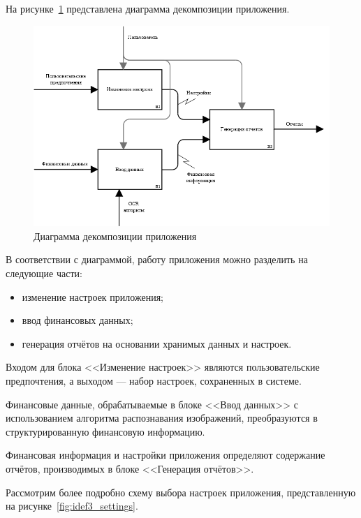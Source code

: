 \pagebreak
На рисунке~\ref{fig:idef0_app} представлена диаграмма декомпозиции
приложения.

\begin{figure}[h!]
  \centering
  \includegraphics[width=150mm]{pic/idef0_app}
  \caption{Диаграмма декомпозиции приложения}
  \label{fig:idef0_app}
\end{figure}

В соответствии с диаграммой, работу приложения можно разделить
на следующие части:
\begin{itemize}
\item изменение настроек приложения;
\item ввод финансовых данных;
\item генерация отчётов на основании хранимых данных и настроек.
\end{itemize}

Входом для блока <<Изменение настроек>> являются пользовательские
предпочтения, а выходом --- набор настроек, сохраненных в системе.

Финансовые данные, обрабатываемые в блоке <<Ввод данных>>
с использованием алгоритма распознавания изображений,
преобразуются в структурированную финансовую информацию.

Финансовая информация и настройки приложения определяют содержание
отчётов, производимых в блоке <<Генерация отчётов>>.

\pagebreak
Рассмотрим более подробно схему выбора настроек приложения,
представленную на рисунке~\ref{fig:idef3_settings}.

